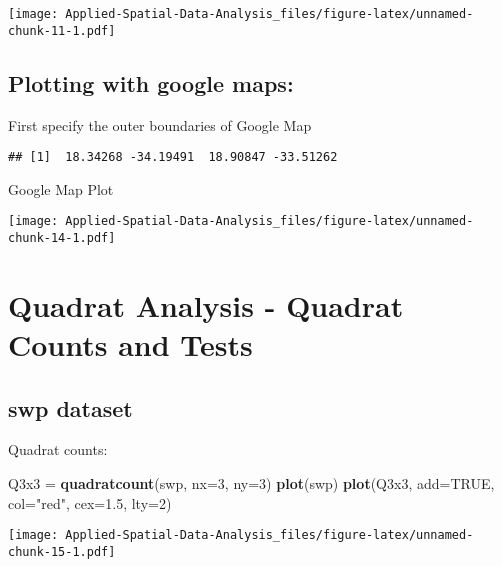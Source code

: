 \documentclass[
]{book}
\newenvironment{Shaded}{\begin{snugshade}}{\end{snugshade}}
\newcommand{\DataTypeTok}[1]{\textcolor[rgb]{0.13,0.29,0.53}{#1}}
\newcommand{\DecValTok}[1]{\textcolor[rgb]{0.00,0.00,0.81}{#1}}
\newcommand{\FloatTok}[1]{\textcolor[rgb]{0.00,0.00,0.81}{#1}}
\newcommand{\KeywordTok}[1]{\textcolor[rgb]{0.13,0.29,0.53}{\textbf{#1}}}
\newcommand{\NormalTok}[1]{#1}
\newcommand{\OtherTok}[1]{\textcolor[rgb]{0.56,0.35,0.01}{#1}}
\newcommand{\StringTok}[1]{\textcolor[rgb]{0.31,0.60,0.02}{#1}}
\begin{document}
\texttt{[image: Applied-Spatial-Data-Analysis\_files/figure-latex/unnamed-chunk-11-1.pdf]}

\hypertarget{plotting-with-google-maps}{%
\subsection{Plotting with google maps:}\label{plotting-with-google-maps}}

First specify the outer boundaries of Google Map

\begin{verbatim}
## [1]  18.34268 -34.19491  18.90847 -33.51262
\end{verbatim}

Google Map Plot

\texttt{[image: Applied-Spatial-Data-Analysis\_files/figure-latex/unnamed-chunk-14-1.pdf]}

\hypertarget{quadrat-analysis---quadrat-counts-and-tests}{%
\section{Quadrat Analysis - Quadrat Counts and Tests}\label{quadrat-analysis---quadrat-counts-and-tests}}

\hypertarget{swp-dataset}{%
\subsection{swp dataset}\label{swp-dataset}}

Quadrat counts:

\begin{Shaded}
\begin{Highlighting}[]
\NormalTok{Q3x3 =}\StringTok{ }\KeywordTok{quadratcount}\NormalTok{(swp, }\DataTypeTok{nx=}\DecValTok{3}\NormalTok{, }\DataTypeTok{ny=}\DecValTok{3}\NormalTok{)}
\KeywordTok{plot}\NormalTok{(swp)}
\KeywordTok{plot}\NormalTok{(Q3x3, }\DataTypeTok{add=}\OtherTok{TRUE}\NormalTok{, }\DataTypeTok{col=}\StringTok{"red"}\NormalTok{, }\DataTypeTok{cex=}\FloatTok{1.5}\NormalTok{, }\DataTypeTok{lty=}\DecValTok{2}\NormalTok{)}
\end{Highlighting}
\end{Shaded}

\texttt{[image: Applied-Spatial-Data-Analysis\_files/figure-latex/unnamed-chunk-15-1.pdf]}
\end{document}
